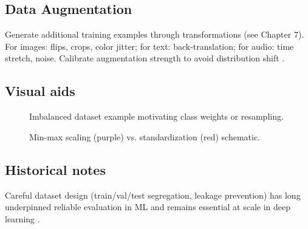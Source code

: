 \subsection{Data Augmentation}

Generate additional training examples through transformations (see Chapter 7). For images: flips, crops, color jitter; for text: back-translation; for audio: time stretch, noise. Calibrate augmentation strength to avoid distribution shift \textcite{Prince2023}.

\subsection{Visual aids}

\begin{figure}[h]
  \centering
  \caption{Imbalanced dataset example motivating class weights or resampling.}
  \label{fig:imbalance-bar}
\end{figure}

\begin{figure}[h]
  \centering
  \caption{Min-max scaling (purple) vs. standardization (red) schematic.}
  \label{fig:scaling}
\end{figure}

\subsection{Historical notes}

Careful dataset design (train/val/test segregation, leakage prevention) has long underpinned reliable evaluation in ML and remains essential at scale in deep learning \textcite{Bishop2006,GoodfellowEtAl2016}.

